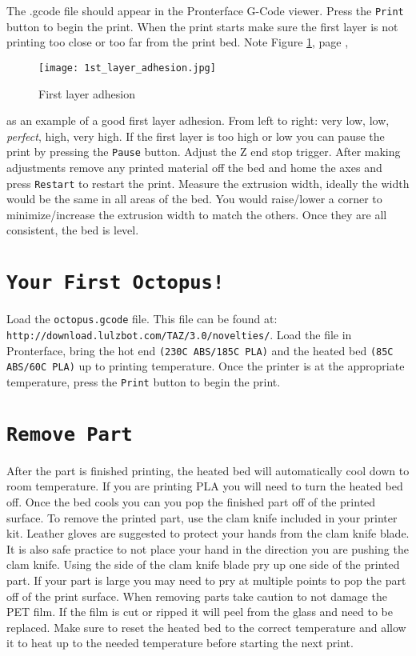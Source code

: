 The .gcode file should appear in the Pronterface G-Code viewer. Press the \texttt{Print} button to begin the print. When the print starts make sure the first layer is not printing too close or too far from the print bed. Note
Figure \ref{fig:1st_layer_adhesion}, page \pageref{fig:1st_layer_adhesion},
\begin{figure}[hbt]
\centering
\texttt{[image: 1st\_layer\_adhesion.jpg]}
\caption{First layer adhesion}
\label{fig:1st_layer_adhesion}
\end{figure}
as an example of a good first layer adhesion. From left to right: very low, low, \emph{perfect}, high, very high. If the first layer is too high or low you can pause the print by pressing the \texttt{Pause} button. Adjust the Z end stop trigger. After making adjustments remove any printed material off the bed and home the axes and press \texttt{Restart} to restart the print. Measure the extrusion width, ideally the width would be the same in all areas of the bed. You would raise/lower a corner to minimize/increase the extrusion width to match the others. Once they are all consistent, the bed is level.

\section{\texttt{Your First Octopus!}}
Load the \texttt{octopus.gcode} file. This file can be found at:
\texttt{http://download.lulzbot.com/TAZ/3.0/novelties/}. Load the file in Pronterface, bring the hot end \texttt{(230C ABS/185C PLA)} and the heated bed \texttt{(85C ABS/60C PLA)} up to printing temperature. Once the printer is at the appropriate temperature, press the \texttt{Print} button to begin the print.

\section{\texttt{Remove Part}}
After the part is finished printing, the heated bed will automatically cool down to room temperature. If you are printing PLA you will need to turn the heated bed off. Once the bed cools you can you pop the finished part off of the printed surface. To remove the printed part, use the clam knife included in your printer kit. Leather gloves are suggested to protect your hands from the clam knife blade. It is also safe practice to not place your hand in the direction you are pushing the clam knife. Using the side of the clam knife blade pry up one side of the printed part. If your part is large you may need to pry at multiple points to pop the part off of the print surface. When removing parts take caution to not damage the PET film. If the film is cut or ripped it will peel from the glass and need to be replaced. Make sure to reset the heated bed to the correct temperature and allow it to heat up to the needed temperature before starting the next print.
